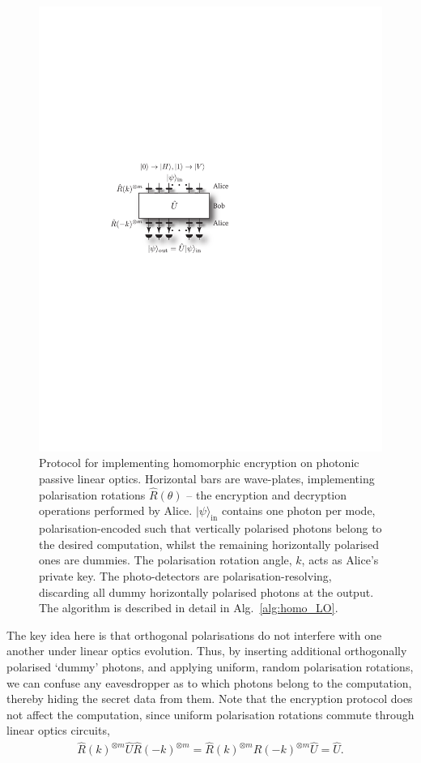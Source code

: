 \documentclass[aps, rmp, twocolumn, amsmath, amssymb, nofootinbib, superscriptaddress, longbibliography, floatfix, table-of-contents, eqsecnum]{revtex4-1}
\newcommand{\ket}[1]{|#1\rangle}
\begin{document}
\begin{figure}[!htb]
\includegraphics[width=0.85\columnwidth]{BS_homo}
\caption{Protocol for implementing homomorphic encryption on photonic passive linear optics. Horizontal bars are wave-plates, implementing polarisation rotations $\hat{R}(\theta)$ -- the encryption and decryption operations performed by Alice. $\ket\psi_\text{in}$ contains one photon per mode, polarisation-encoded such that vertically polarised photons belong to the desired computation, whilst the remaining horizontally polarised ones are dummies. The polarisation rotation angle, $k$, acts as Alice's private key. The photo-detectors are polarisation-resolving, discarding all dummy horizontally polarised photons at the output. The algorithm is described in detail in Alg.~\ref{alg:homo_LO}.} \label{fig:BS_homo}
\end{figure}

The key idea here is that orthogonal polarisations do not interfere with one another under linear optics evolution. Thus, by inserting additional orthogonally polarised `dummy' photons, and applying uniform, random polarisation rotations, we can confuse any eavesdropper as to which photons belong to the computation, thereby hiding the secret data from them. Note that the encryption protocol does not affect the computation, since uniform polarisation rotations commute through linear optics circuits,
\begin{align} \label{eq:LO_key_commute}
\hat{R}(k)^{\otimes m} \hat{U} \hat{R}(-k)^{\otimes m} = \hat{R}(k)^{\otimes m} \hat{R}(-k)^{\otimes m} \hat{U} = \hat{U}.
\end{align}
\end{document}
